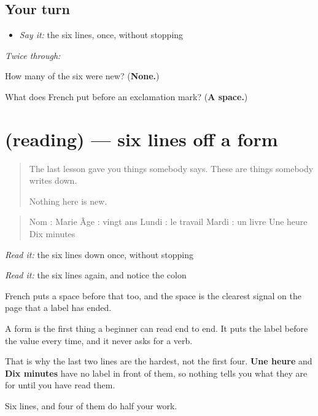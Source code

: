 \subsection*{Your turn}
\begin{itemize}
\raggedright
  \item \emph{Say it:} the six lines, once, without stopping
\end{itemize}

\emph{Twice through:}

\begin{tcolorbox}[breakable,colback=teal!4,colframe=teal!35!black,title={Before you move on}]
How many of the six were new? (\textbf{None.})

What does French put before an exclamation mark? (\textbf{A space.})
\end{tcolorbox}
\section[(reading)]{(reading) — six lines off a form}

\label{lesson:FR-C45-details}



\begin{quote}
The last lesson gave you things somebody says. These are things somebody writes down.

Nothing here is new.
\end{quote}

\begin{tcolorbox}[breakable,skin=enhanced,colback=orange!6,colframe=orange!45!black,boxrule=0.5pt,arc=1mm,left=6pt,right=6pt,top=4pt,bottom=4pt,fonttitle=\bfseries,title={Read this}]
\begin{quote}
Nom : Marie Âge : vingt ans Lundi : le travail Mardi : un livre Une heure Dix minutes
\end{quote}

\emph{Read it:} the six lines down once, without stopping

\emph{Read it:} the six lines again, and notice the colon

French puts a space before that too, and the space is the clearest signal on the page that a label has ended.
\end{tcolorbox}

\begin{culture}
A form is the first thing a beginner can read end to end. It puts the label before the value every time, and it never asks for a verb.

That is why the last two lines are the hardest, not the first four. \textbf{Une heure} and \textbf{Dix minutes} have no label in front of them, so nothing tells you what they are for until you have read them.

Six lines, and four of them do half your work.
\end{culture}

